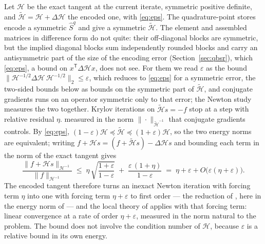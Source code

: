\documentclass[sigconf,balance=false]{acmart}
\newcommand{\Sq}{\widehat{S}^{q}}
\newcommand{\eps}{\varepsilon}
\begin{document}
Let $\mathcal{H}$ be the exact tangent at the current iterate, symmetric positive definite, and
$\widetilde{\mathcal{H}}=\mathcal{H}+\Delta\mathcal{H}$ the encoded one, with \eqref{eq:eps}.
The quadrature-point stores encode a symmetric $\Sq$ and give a symmetric $\widetilde{\mathcal{H}}$.
The element and assembled matrices in difference form do not quite: their off-diagonal blocks are
symmetric, but the implied diagonal blocks sum independently rounded blocks and carry an
antisymmetric part of the size of the encoding error (Section~\ref{sec:qbsr}), which
\eqref{eq:eps}, a bound on $x^{\mathsf T}\Delta\mathcal{H}x$, does not see.  For them we read $\eps$
as the bound $\|\mathcal{H}^{-1/2}\Delta\mathcal{H}\,\mathcal{H}^{-1/2}\|_2\le\eps$, which reduces
to \eqref{eq:eps} for a symmetric error, the two-sided bounds below as bounds on the symmetric part
of $\widetilde{\mathcal{H}}$, and conjugate gradients runs on an operator symmetric only to that
error; the Newton study measures the two together.
Krylov iterations on $\widetilde{\mathcal{H}}s=-f$ stop at a step with relative residual $\eta$.
measured in the norm $\|\cdot\|_{\widetilde{\mathcal{H}}^{-1}}$ that conjugate gradients
controls.  By \eqref{eq:eps}, $(1-\eps)\mathcal{H}\preceq\widetilde{\mathcal{H}}\preceq(1+\eps)
\mathcal{H}$, so the two energy norms are equivalent; writing $f+\mathcal{H}s = (f+\widetilde
{\mathcal{H}}s) - \Delta\mathcal{H}s$ and bounding each term in the norm of the exact tangent gives
\begin{equation}
  \frac{\|f + \mathcal{H}s\|_{\mathcal{H}^{-1}}}{\|f\|_{\mathcal{H}^{-1}}}
  \;\le\; \eta\,\sqrt{\frac{1+\eps}{1-\eps}} \;+\; \frac{\eps\,(1+\eta)}{1-\eps}
  \;=\; \eta + \eps + O\bigl(\eps(\eta+\eps)\bigr) .
  \label{eq:forcing}
\end{equation}
The encoded tangent therefore turns an inexact Newton
iteration with forcing term $\eta$ into one with forcing term $\eta+\eps$ to first order --- the
reduction of \cite{Catinas2001}, here in the energy norm of \cite{Deuflhard2004} --- and the
local theory of \cite{DemboEisenstatSteihaug1982} applies with that forcing term: linear
convergence at a rate of order $\eta+\eps$, measured in the norm natural to the problem.  The bound
does not involve the condition number of $\mathcal{H}$, because $\eps$ is a relative bound in its
own energy.
\end{document}
